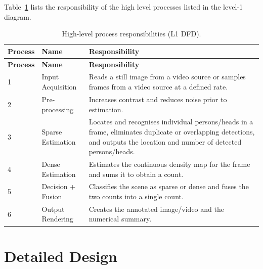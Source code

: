 Table~\ref{tab:hld-processes} lists the responsibility of the high level processes listed in the level-1 diagram.



\begin{longtable}{|
		>{\raggedright\arraybackslash}p{1.6cm}|
		>{\raggedright\arraybackslash}p{3.2cm}|
		>{\raggedright\arraybackslash}p{9.0cm}|
	}
	\caption{High-level process responsibilities (L1 DFD).}
	\label{tab:hld-processes} \\
	\hline
	\textbf{Process} & \textbf{Name} & \textbf{Responsibility} \\
	\hline
	\endfirsthead
	
	\hline
	\textbf{Process} & \textbf{Name} & \textbf{Responsibility} \\
	\hline
	\endhead
	
	1 & Input Acquisition &
	Reads a still image from a video source or samples frames from a video source at a defined rate. \\
	\hline
	
	2 & Pre-processing &
	Increases contrast and reduces noise prior to estimation. \\
	\hline
	
	3 & Sparse Estimation &
	Locates and recognises individual persons/heads in a frame, eliminates duplicate or overlapping detections, and outputs the location and number of detected persons/heads. \\
	\hline
	
	4 & Dense Estimation &
	Estimates the continuous density map for the frame and sums it to obtain a count. \\
	\hline
	
	5 & Decision + Fusion &
	Classifies the scene as sparse or dense and fuses the two counts into a single count. \\
	\hline
	
	6 & Output Rendering &
	Creates the annotated image/video and the numerical summary. \\
	\hline
	
\end{longtable}


\section{Detailed Design}
\label{sec:detailed-design}


